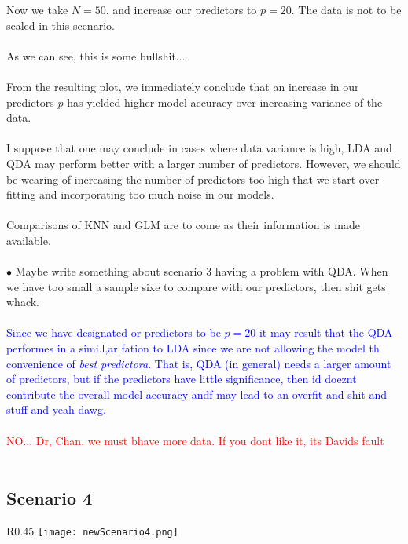 \documentclass[11pt, oneside]{article}
\begin{document}
Now we take $N=50$, and increase our predictors to $p=20$. The data is not to be scaled in this scenario.\\
\\
As we can see, this is some bullshit...\\
\\

From the resulting plot, we immediately conclude that an increase in our predictors $p$ has yielded higher model accuracy over increasing variance of the data.\\
\\
I suppose that one may conclude in cases where data variance is high, LDA and QDA may perform better with a larger number of predictors. However, we should be wearing of increasing the number of predictors too high that we start over-fitting and incorporating too much noise in our models.\\
\\

Comparisons of KNN and GLM are to come as their information is made available.\\
\\
$\bullet$ Maybe write something about scenario 3 having a problem with QDA. When we have too small a sample sixe to compare with our predictors, then shit gets whack.\\
\\
\textcolor{blue}{Since we have designated or predictors to be $p=20$ it may result that the QDA performes in a simi.l,ar fation to LDA since we are not allowing the model th convenience of \emph{best predictora}. That is, QDA  (in general) needs a larger amount of predictors, but if the predictors have little significance, then id doeznt contribute the overall model accuracy andf may lead to an overfit and shit and stuff and yeah dawg.}\\
\\
\textcolor{red}{NO... Dr, Chan. we must bhave more data. If you dont like it, its Davids fault}\\
\\
 

\subsection*{Scenario 4}
\begin{wrapfigure}[]{R}{0.45\textwidth}
\vspace{-0.55cm}
\texttt{[image: newScenario4.png]}
\vspace{-.55cm}
\end{wrapfigure}
\end{document}
